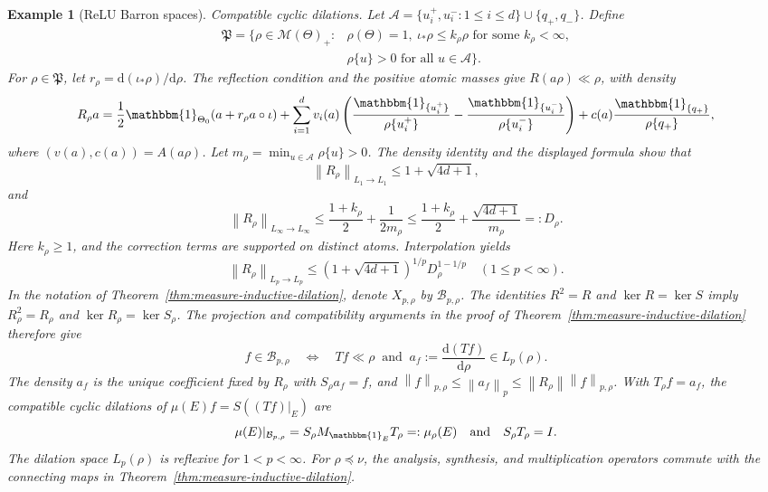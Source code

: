 \documentclass[11pt,leqno]{amsart}
\theoremstyle{compact}
\numberwithin{equation}{section}
\theoremstyle{compactremark}
\newtheorem{example}[theorem]{Example}
\theoremstyle{compact}
\newcommand{\1}{\mathbbm{1}}
\newcommand{\rmd}{\mathrm{d}}
\newcommand{\norm}[1]{\left\|#1\right\|}
\begin{document}
\begin{example}[ReLU Barron spaces]
\textit{Compatible cyclic dilations.} Let $\mathcal A=\{u_i^+,u_i^-:1\leq i\leq d\}\cup\{q_+,q_-\}$. Define
\[
\begin{aligned}
    \mathfrak P=\{\rho\in\mathcal M(\Theta)_+:{}&\rho(\Theta)=1,\ \iota_*\rho\leq k_\rho\rho\text{ for some }k_\rho<\infty,\\
    &\rho\{u\}>0 \text{ for all } u\in\mathcal A\}.
\end{aligned}
\]
For $\rho\in\mathfrak P$, let $r_\rho=\rmd(\iota_*\rho)/\rmd\rho$. The reflection condition and the positive atomic masses give $R(a\rho)\ll\rho$, with density
\begin{align*}
R_\rho a
=\frac{1}{2}\1_{\Theta_0}(a+r_\rho a\circ\iota)+\sum_{i=1}^dv_i(a)\left(\frac{\1_{\{u_i^+\}}}{\rho\{u_i^+\}}-\frac{\1_{\{u_i^-\}}}{\rho\{u_i^-\}}\right)
  +c(a)\frac{\1_{\{q_+\}}}{\rho\{q_+\}},
\end{align*}
where $(v(a),c(a))=A(a\rho)$. Let $m_\rho=\min_{u\in\mathcal A}\rho\{u\}>0$. The density identity and the displayed formula show that
\[
\norm{R_\rho}_{L_1\to L_1}\leq1+\sqrt{4d+1},
\]
and
\[
\norm{R_\rho}_{L_\infty\to L_\infty}\leq\frac{1+k_\rho}{2}+\frac{1}{2m_\rho}    \leq\frac{1+k_\rho}{2}+\frac{\sqrt{4d+1}}{m_\rho}=:D_\rho.
\]
Here $k_\rho\geq1$, and the correction terms are supported on distinct atoms. Interpolation yields
\[
\norm{R_\rho}_{L_p\to L_p}\leq(1+\sqrt{4d+1})^{1/p}D_\rho^{1-1/p}\quad(1\leq p<\infty).
\]
In the notation of Theorem~\ref{thm:measure-inductive-dilation}, denote $X_{p,\rho}$ by $\mathcal B_{p,\rho}$. The identities $R^2=R$ and $\ker R=\ker S$ imply $R_\rho^2=R_\rho$ and $\ker R_\rho=\ker S_\rho$. The projection and compatibility arguments in the proof of Theorem~\ref{thm:measure-inductive-dilation} therefore give
\[
f\in\mathcal B_{p,\rho}\quad\Longleftrightarrow\quad
Tf\ll\rho\ \text{ and }\ a_f:=\frac{\rmd(Tf)}{\rmd\rho}\in L_p(\rho).
\]
The density $a_f$ is the unique coefficient fixed by $R_\rho$ with $S_\rho a_f=f$, and $ \norm{f}_{p,\rho}\leq\norm{a_f}_p\leq\norm{R_\rho}\norm{f}_{p,\rho}$. With $T_\rho f=a_f$, the compatible cyclic dilations of $\mu(E)f=S((Tf)|_E)$ are
\[
\mu(E)|_{\mathcal B_{p,\rho}}=S_\rho M_{\1_E}T_\rho=:\mu_\rho(E)\quad\text{and}\quad S_\rho T_\rho=I.
\]
The dilation space $L_p(\rho)$ is reflexive for $1<p<\infty$. For $\rho\preceq\nu$, the analysis, synthesis, and multiplication operators commute with the connecting maps in Theorem~\ref{thm:measure-inductive-dilation}.


\end{example}
\end{document}
